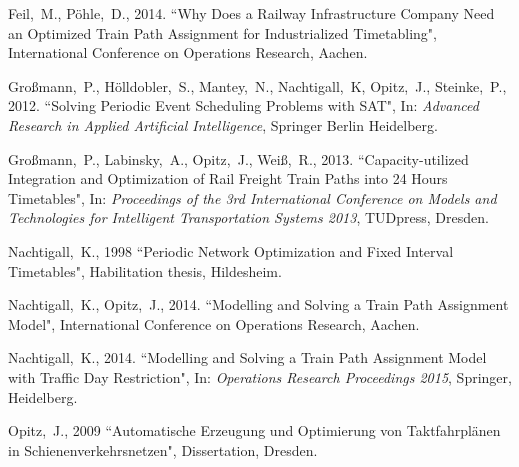 \documentclass[10pt,a4paper,oneside,onecolumn]{article}
\begin{document}
\begin{thebibliography}{99}
	\setlength{\itemsep}{0\parskip}

	Feil,~M., P\"ohle,~D., 2014.
	{``Why Does a Railway Infrastructure Company Need an Optimized Train Path Assignment for Industrialized Timetabling"},
	International Conference on Operations Research,
	Aachen.
	
	Gro{\ss}mann,~P., H\"olldobler,~S., Mantey,~N., Nachtigall,~K, Opitz,~J., Steinke,~P., 2012.
	``Solving Periodic Event Scheduling Problems with SAT",
	In: {\em Advanced Research in Applied Artificial Intelligence},
	Springer Berlin Heidelberg.
	
	Gro{\ss}mann,~P., Labinsky,~A., Opitz,~J., Wei{\ss},~R., 2013.
	``Capacity-utilized Integration and Optimization of Rail Freight Train Paths into 24 Hours Timetables",
	In: {\em Proceedings of the 3rd International Conference on Models and Technologies for Intelligent Transportation Systems 2013},
	TUDpress, Dresden.	
	
	Nachtigall,~K., 1998
	{``Periodic Network Optimization and Fixed Interval Timetables"},
	Habilitation thesis,
	Hildesheim.
	
	Nachtigall,~K., Opitz,~J., 2014.
	{``Modelling and Solving a Train Path Assignment Model"},
	International Conference on Operations Research,
	Aachen.
	
	Nachtigall,~K., 2014.
	{``Modelling and Solving a Train Path Assignment Model with Traffic Day Restriction"},
	In: {\em Operations Research Proceedings 2015},
	Springer, Heidelberg.	
	
	Opitz,~J., 2009
	{``Automatische Erzeugung und Optimierung von Taktfahrplänen in Schienenverkehrsnetzen"},
	Dissertation,
	Dresden.	
	
\end{thebibliography}

\end{document}
